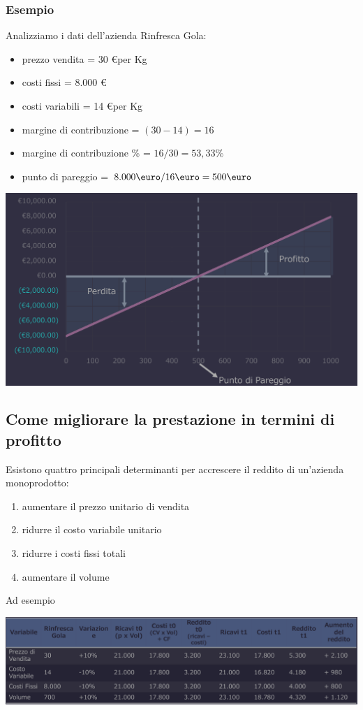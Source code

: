 \documentclass{article}
\begin{document}
\subsubsection{Esempio}
Analizziamo i dati dell'azienda Rinfresca Gola:
\begin{itemize}
    \item prezzo vendita = 30 \euro per Kg
    \item costi fissi = 8.000 \euro
    \item costi variabili = 14 \euro per Kg
    \item margine di contribuzione = $(30 - 14) = 16$
    \item margine di contribuzione \% = $16/30 = 53,33 \%$
    \item punto di pareggio = $8.000 \T{\euro}/16 \T{\euro} = 500 \T{\euro}$ 
\end{itemize}
\begin{center}
    \includegraphics[scale=0.3]{Image/MargineContr_2.png}
\end{center}



\subsection{Come migliorare la prestazione in termini di profitto}
Esistono quattro principali determinanti per accrescere il reddito di un'azienda monoprodotto:
\begin{enumerate}
    \item aumentare il prezzo unitario di vendita
    \item ridurre il costo variabile unitario
    \item ridurre i costi fissi totali
    \item aumentare il volume
\end{enumerate}
Ad esempio
\begin{center}
    \includegraphics[scale=0.3]{Image/PrestazioniProf_1.png}
\end{center}
\end{document}
